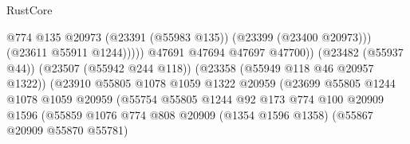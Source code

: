 \begin{lexlean}{RustCore}
\begin{coremodule}
                                                              @774
                                                              @135
                                                              @20973
                                                              (@23391 (@55983 @135))
                                                              (@23399 (@23400 @20973)))
                                                            (@23611 @55911 @1244)))))
                                                    @47691
                                                    @47694
                                                    @47697
                                                    @47700))
                                                (@23482 (@55937 @44))
                                                (@23507 (@55942 @244 @118))
                                                (@23358 (@55949 @118 @46 @20957 @1322))
                                                (@23910
                                                  @55805
                                                  @1078
                                                  @1059
                                                  @1322
                                                  @20959
                                                  (@23699
                                                    @55805
                                                    @1244
                                                    @1078
                                                    @1059
                                                    @20959
                                                    (@55754
                                                      @55805
                                                      @1244
                                                      @92
                                                      @173
                                                      @774
                                                      @100
                                                      @20909
                                                      @1596
                                                      (@55859
                                                        @1076
                                                        @774
                                                        @808
                                                        @20909
                                                        (@1354 @1596 @1358)
                                                        (@55867 @20909 @55870 @55781)

\end{coremodule}
\end{lexlean}
